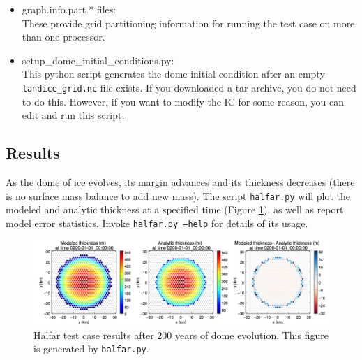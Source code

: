 \begin{itemize}

	\item graph.info.part.* files: \\ 
		These provide grid partitioning information for running the test case on more than one processor.  
		
	\item setup\_dome\_initial\_conditions.py: \\
		This python script generates the dome initial condition after an empty \texttt{landice\_grid.nc} file exists.  
		If you downloaded a tar archive, you do not need to do this.  However, if you want to modify the IC for 
		some reason, you can edit and run this script.

\end{itemize}

\subsection{Results}
\label{subsecc:halfar_results}
As the dome of ice evolves, its margin advances and its thickness decreases (there is no surface mass balance to add new mass).  The script \texttt{halfar.py} will plot the modeled and analytic thickness at a specified time (Figure \ref{fig:halfarresults}), as well as report model error statistics.  Invoke \texttt{halfar.py --help} for details of its usage.


\begin{figure}[H]
	\centering
	\includegraphics[width=16.4cm]{landice/figures/halfar.png}
	\caption{Halfar test case results after 200 years of dome evolution. This figure is generated by \texttt{halfar.py}.}
	\label{fig:halfarresults}
\end{figure}


